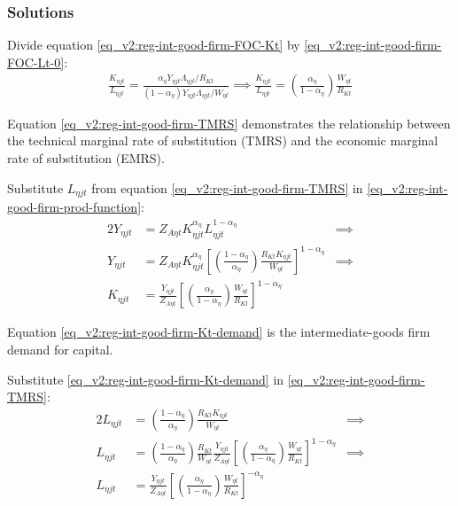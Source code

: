 \documentclass[../thesis.tex]{subfiles}
\begin{document}
\subsubsection*{Solutions}

Divide equation \ref{eq_v2:reg-int-good-firm-FOC-Kt} by \ref{eq_v2:reg-int-good-firm-FOC-Lt-0}:
\begin{align}
	\frac{K_{\eta jt}}{L_{\eta jt}} = \frac{{\alpha_{\eta}} Y_{\eta jt} \Lambda_{\eta jt} /R_{Kt}}{(1-\alpha_{\eta}) Y_{\eta jt} \Lambda_{\eta jt} /W_{\eta t}} \implies
	\frac{K_{\eta jt}}{L_{\eta jt}} = \left( \frac{{\alpha_{\eta}}}{1-\alpha_{\eta}} \right) \frac{W_{\eta t}}{R_{Kt}} \label{eq_v2:reg-int-good-firm-TMRS}
\end{align}

Equation \ref{eq_v2:reg-int-good-firm-TMRS} demonstrates the relationship between the technical marginal rate of substitution (TMRS) and the economic marginal rate of substitution (EMRS). 

Substitute $L_{\eta jt}$ from equation \ref{eq_v2:reg-int-good-firm-TMRS} in \ref{eq_v2:reg-int-good-firm-prod-function}:
\begin{alignat}{2}
	Y_{\eta jt} & = Z_{A\eta t} K_{\eta jt}^{\alpha_{\eta}} L_{\eta jt}^{1-\alpha_{\eta}} &\implies \nonumber \\
	Y_{\eta jt} & = Z_{A\eta t} K_{\eta jt}^{\alpha_{\eta}} \left[ \left( \frac{1-\alpha_{\eta}}{{\alpha_{\eta}}} \right) \frac{R_{Kt} K_{\eta jt}}{W_{\eta t}} \right]^{1-\alpha_{\eta}} &\implies \nonumber \\
	K_{\eta jt} & = \frac{Y_{\eta jt}}{Z_{A\eta t}} \left[ \left( \frac{{\alpha_{\eta}}}{1-\alpha_{\eta}} \right) \frac{W_{\eta t}}{R_{Kt}}\right]^{1-\alpha_{\eta}} \label{eq_v2:reg-int-good-firm-Kt-demand}
\end{alignat}

Equation \ref{eq_v2:reg-int-good-firm-Kt-demand} is the intermediate-goods firm demand for capital. 

Substitute \ref{eq_v2:reg-int-good-firm-Kt-demand} in \ref{eq_v2:reg-int-good-firm-TMRS}:
\begin{alignat}{2}
	L_{\eta jt} & = \left( \frac{1-\alpha_{\eta}}{{\alpha_{\eta}}} \right) \frac{R_{Kt} K_{\eta jt}}{W_{\eta t}} &\implies \nonumber \\
	L_{\eta jt} & = \left( \frac{1-\alpha_{\eta}}{{\alpha_{\eta}}} \right) \frac{R_{Kt}}{W_{\eta t}} \frac{Y_{\eta jt}}{Z_{A\eta t}} \left[ \left( \frac{{\alpha_{\eta}}}{1-\alpha_{\eta}} \right) \frac{W_{\eta t}}{R_{Kt}}\right]^{1-\alpha_{\eta}} &\implies \nonumber \\
	L_{\eta jt} & = \frac{Y_{\eta jt}}{Z_{A\eta t}} \left[ \left( \frac{{\alpha_{\eta}}}{1-\alpha_{\eta}} \right) \frac{W_{\eta t}}{R_{Kt}}\right]^{-{\alpha_{\eta}}} \label{eq_v2:reg-int-good-firm-Lt-demand}
\end{alignat}
\end{document}
